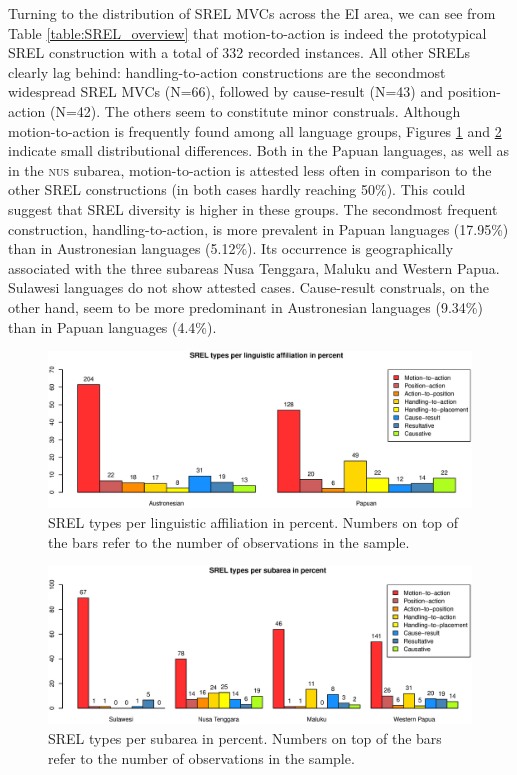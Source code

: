 Turning to the distribution of SREL MVCs across the EI area, we can see from Table \ref{table:SREL_overview} that motion-to-action is indeed the prototypical SREL construction with a total of 332 recorded instances. All other SRELs clearly lag behind: handling-to-action constructions are the secondmost widespread SREL MVCs (N=66), followed by cause-result (N=43) and position-action (N=42). The others seem to constitute minor construals. Although motion-to-action is frequently found among all language groups, Figures \ref{fig:srel-family} and \ref{fig:srel-group} indicate small distributional differences. Both in the Papuan languages, as well as in the \textsc{nus} subarea, motion-to-action is attested less often in comparison to the other SREL constructions (in both cases hardly reaching 50\%). This could suggest that SREL diversity is higher in these groups. The secondmost frequent construction, handling-to-action, is more prevalent in Papuan languages (17.95\%) than in Austronesian languages (5.12\%). Its occurrence is geographically associated with the three subareas Nusa Tenggara, Maluku and Western Papua. Sulawesi languages do not show attested cases. Cause-result construals, on the other hand, seem to be more predominant in Austronesian languages (9.34\%) than in Papuan languages (4.4\%).

\begin{figure}[ht]
\includegraphics[width=\columnwidth]{figures/SREL_Family.eps}
\caption[SREL types per linguistic affiliation in percent]{SREL types per linguistic affiliation in percent. Numbers on top of the bars refer to the number of observations in the sample.}\label{fig:srel-family}
\end{figure}
\begin{figure}[ht]
\includegraphics[width=\columnwidth]{figures/SREL_Group.eps}
\caption[SREL types per subarea in percent]{SREL types per subarea in percent. Numbers on top of the bars refer to the number of observations in the sample.}\label{fig:srel-group}
\end{figure}

